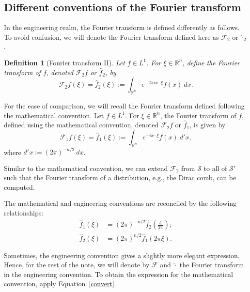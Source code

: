 \documentclass[12pt, letterpaper]{article}
\theoremstyle{plain}
\newtheorem{definition}[theorem]{Definition}
\begin{document}
\subsection{Different conventions of the Fourier transform}

In the engineering realm, the Fourier transform is defined differently as follows. To avoid confusion, we will denote the Fourier transform defined here as $\mathcal{F}_2$ or $\hat{\cdot}_2$. 

\begin{definition}[Fourier transform II]\label{F2}
    Let $f \in L^1$. For $\xi \in \mathbb{R}^n$, define the Fourier transform of $f$, denoted $\mathcal{F}_2f$ or $\hat{f}_2$, by
    \begin{equation}
        \mathcal{F}_2f(\xi) = \hat{f}_2(\xi) := \int_{\mathbb{R}^n} e^{-2\pi ix \cdot \xi} f(x) \ dx.
    \end{equation}
\end{definition}

For the ease of comparison, we will recall the Fourier transform defined following the mathematical convention. Let $f \in L^1$. For $\xi \in \mathbb{R}^n$, the Fourier transform of $f$, defined using the mathematical convention, denoted $\mathcal{F}_2f$ or $\hat{f}_1$, is given by
\begin{equation}
    \mathcal{F}_1f(\xi) = \hat{f}_1(\xi) := \int_{\mathbb{R}^n} e^{-ix \cdot \xi} f(x) \ d'x,
\end{equation}
where $d'x := (2\pi)^{-n/2} \ dx$.

Similar to the mathematical convention, we can extend $\mathcal{F}_2$ from $\mathcal{S}$ to all of $\mathcal{S}'$ such that the Fourier transform of a distribution, e.g., the Dirac comb, can be computed. 

The mathematical and engineering conventions are reconciled by the following relationships:
\begin{align}
    \hat{f}_1(\xi) & = (2\pi)^{-n/2} \hat{f}_2\left(\frac{\xi}{2\pi}\right); \label{convert}\\
    \hat{f}_2(\xi) & = (2\pi)^{n/2} \hat{f}_1(2\pi\xi).    
\end{align}

Sometimes, the engineering convention gives a slightly more elegant expression. Hence, for the rest of the note, we will denote by $\mathcal{F}$ and $\hat{\cdot}$ the Fourier transform in the engineering convention. To obtain the expression for the mathematical convention, apply Equation~\ref{convert}.
\end{document}
